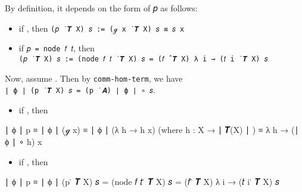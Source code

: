By definition, it depends on the form of 𝑝 as follows:

\begin{itemize}
\item
  if , then
  \texttt{(𝑝\ ̇\ 𝑻\ X)\ 𝑠\ :=\ (ℊ\ x\ ̇\ 𝑻\ X)\ 𝑠\ ≡\ 𝑠\ x}
\item
  if \texttt{𝑝\ =\ node\ 𝑓\ 𝑡}, then
  \texttt{(𝑝\ ̇\ 𝑻\ X)\ 𝑠\ :=\ (node\ 𝑓\ 𝑡\ ̇\ 𝑻\ X)\ 𝑠\ =\ (𝑓\ ̂\ 𝑻\ X)\ λ\ i\ →\ (𝑡\ i\ ̇\ 𝑻\ X)\ 𝑠}
\end{itemize}

Now, assume . Then by \texttt{comm-hom-term}, we
have \texttt{∣\ ϕ\ ∣\ (p\ ̇\ 𝑻\ X)\ 𝑠\ =\ (p\ ̇\ 𝑨)\ ∣\ ϕ\ ∣\ ∘\ 𝑠}.

\begin{itemize}
\tightlist
\item
  if , then
\end{itemize}

∣ ϕ ∣ p ≡ ∣ ϕ ∣ (ℊ x) ≡ ∣ ϕ ∣ (λ h → h x) (where h : X → ∣ 𝑻(X) ∣ ) ≡ λ
h → (∣ ϕ ∣ ∘ h) x

\begin{itemize}
\tightlist
\item
  if , then
\end{itemize}

∣ ϕ ∣ p ≡ ∣ ϕ ∣ (p ̇ 𝑻 X) 𝑠 = (node 𝑓 𝑡 ̇ 𝑻 X) 𝑠 = (𝑓 ̂ 𝑻 X) λ i → (𝑡 i ̇ 𝑻
X) 𝑠

